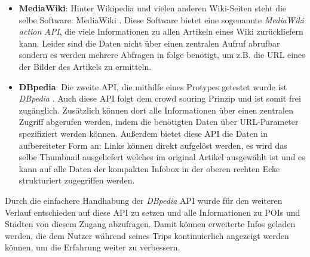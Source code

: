 \begin{itemize}
	\item \textbf{MediaWiki}: Hinter Wikipedia und vielen anderen Wiki-Seiten steht die selbe Software: MediaWiki \cite{MediaWiki.24.01.2020}. Diese Software bietet eine sogenannte \textit{MediaWiki action API}, die viele Informationen zu allen Artikeln eines Wiki zurückliefern kann. Leider sind die Daten nicht über einen zentralen Aufruf abrufbar sondern es werden mehrere Abfragen in folge benötigt, um z.B. die URL eines der Bilder des Artikels zu ermitteln.
	\item \textbf{DBpedia}: Die zweite API, die mithilfe eines Protypes getestet wurde ist \textit{DBpedia} \cite{DBpedia.02.02.2020}. Auch diese API folgt dem crowd souring Prinzip und ist somit frei zugänglich. Zusätzlich können dort alle Informationen über einen zentralen Zugriff abgerufen werden, indem die benötigten Daten über URL-Parameter spezifiziert werden können. Außerdem bietet diese API die Daten in aufbereiteter Form an: Links können direkt aufgelöst werden, es wird das selbe Thumbnail ausgeliefert welches im original Artikel ausgewählt ist und es kann auf alle Daten der kompakten Infobox in der oberen rechten Ecke strukturiert zugegriffen werden.
\end{itemize}

Durch die einfachere Handhabung der \textit{DBpedia} API wurde für den weiteren Verlauf entschieden auf diese API zu setzen und alle Informationen zu POIs und Städten von diesem Zugang abzufragen. Damit können erweiterte Infos geladen werden, die dem Nutzer während seines Trips kontinuierlich angezeigt werden können, um die Erfahrung weiter zu verbessern.